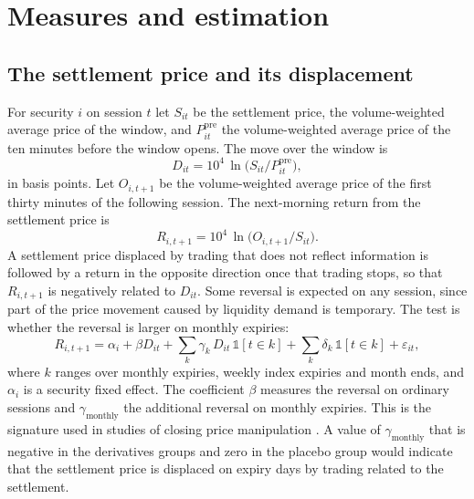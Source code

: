 \section{Measures and estimation}\label{sec:method}

\subsection{The settlement price and its displacement}

For security $i$ on session $t$ let $S_{it}$ be the settlement price, the volume-weighted
average price of the window, and $P^{\mathrm{pre}}_{it}$ the volume-weighted average price of
the ten minutes before the window opens. The move over the window is
\begin{equation}
  D_{it} = 10^{4}\,\ln\bigl(S_{it} / P^{\mathrm{pre}}_{it}\bigr),
\end{equation}
in basis points. Let $O_{i,t+1}$ be the volume-weighted average price of the first thirty
minutes of the following session. The next-morning return from the settlement price is
\begin{equation}
  R_{i,t+1} = 10^{4}\,\ln\bigl(O_{i,t+1} / S_{it}\bigr).
\end{equation}
A settlement price displaced by trading that does not reflect information is followed by a
return in the opposite direction once that trading stops, so that $R_{i,t+1}$ is negatively
related to $D_{it}$. Some reversal is expected on any session, since part of the price
movement caused by liquidity demand is temporary. The test is whether the reversal is larger
on monthly expiries:
\begin{equation}
  R_{i,t+1} = \alpha_i + \beta D_{it}
      + \sum_{k} \gamma_k \, D_{it} \, \mathbb{1}[t \in k]
      + \sum_{k} \delta_k \, \mathbb{1}[t \in k] + \varepsilon_{it},
  \label{eq:reversal}
\end{equation}
where $k$ ranges over monthly expiries, weekly index expiries and month ends, and
$\alpha_i$ is a security fixed effect. The coefficient $\beta$ measures the reversal on
ordinary sessions and $\gamma_{\text{monthly}}$ the additional reversal on monthly expiries.
This is the signature used in studies of closing price manipulation
\citep{carhart2002leaning, hillion2004price, comerton2011measuring}. A value of
$\gamma_{\text{monthly}}$ that is negative in the derivatives groups and zero in the placebo
group would indicate that the settlement price is displaced on expiry days by trading
related to the settlement.

